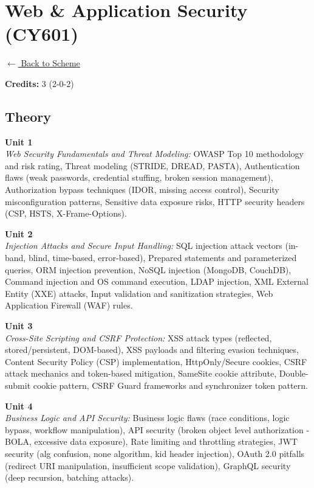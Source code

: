 \section*{Web \& Application Security (CY601)}
\label{major:CS_6}

\noindent \small{\hyperref[main:scheme]{$\leftarrow$ Back to Scheme}} \vspace{0.5cm}

\noindent \textbf{Credits:} 3 (2-0-2)

\subsection*{Theory}
\noindent\textbf{Unit 1} \\
\textit{Web Security Fundamentals and Threat Modeling:} OWASP Top 10 methodology and risk rating, Threat modeling (STRIDE, DREAD, PASTA), Authentication flaws (weak passwords, credential stuffing, broken session management), Authorization bypass techniques (IDOR, missing access control), Security misconfiguration patterns, Sensitive data exposure risks, HTTP security headers (CSP, HSTS, X-Frame-Options).

\vspace{0.3cm}

\noindent\textbf{Unit 2} \\
\textit{Injection Attacks and Secure Input Handling:} SQL injection attack vectors (in-band, blind, time-based, error-based), Prepared statements and parameterized queries, ORM injection prevention, NoSQL injection (MongoDB, CouchDB), Command injection and OS command execution, LDAP injection, XML External Entity (XXE) attacks, Input validation and sanitization strategies, Web Application Firewall (WAF) rules.

\vspace{0.3cm}

\noindent\textbf{Unit 3} \\
\textit{Cross-Site Scripting and CSRF Protection:} XSS attack types (reflected, stored/persistent, DOM-based), XSS payloads and filtering evasion techniques, Content Security Policy (CSP) implementation, HttpOnly/Secure cookies, CSRF attack mechanics and token-based mitigation, SameSite cookie attribute, Double-submit cookie pattern, CSRF Guard frameworks and synchronizer token pattern.

\vspace{0.3cm}

\noindent\textbf{Unit 4} \\
\textit{Business Logic and API Security:} Business logic flaws (race conditions, logic bypass, workflow manipulation), API security (broken object level authorization - BOLA, excessive data exposure), Rate limiting and throttling strategies, JWT security (alg confusion, none algorithm, kid header injection), OAuth 2.0 pitfalls (redirect URI manipulation, insufficient scope validation), GraphQL security (deep recursion, batching attacks).

